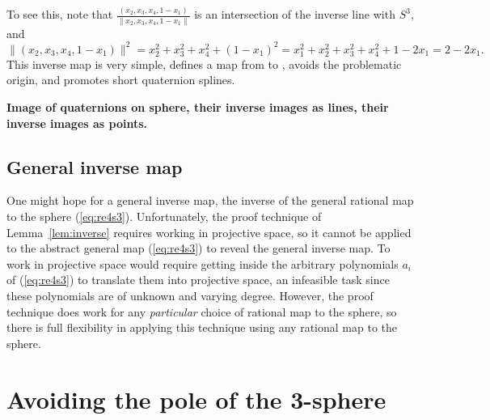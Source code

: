 \documentclass[11pt]{article}
\begin{document}
%
To see this, note that $\frac{(x_2,x_3,x_4,1-x_1)}{\|x_2,x_3,x_4,1-x_1\|}$ is
an intersection of the inverse line with $S^3$, and
\[
\|(x_2,x_3,x_4,1-x_1)\|^2 = x_2^2 + x_3^2 + x_4^2 + (1-x_1)^2
= x_1^2 + x_2^2 + x_3^2 + x_4^2 + 1 - 2x_1 = 2 - 2x_1.
\]
%
This inverse map is very simple, defines a map from  to ,
avoids the problematic origin, and promotes short quaternion splines.


{\bf Image of quaternions on sphere, their inverse images as lines, their inverse images
as points.}


\subsection{General inverse map}

One might hope for a general inverse map, the inverse of the general 
rational map to the sphere (\ref{eq:re4s3}).
Unfortunately, the proof technique of Lemma~\ref{lem:inverse}
requires working in projective space, 
so it cannot be applied to the abstract general map (\ref{eq:re4s3})
to reveal the general inverse map.
To work in projective space
would require getting inside the arbitrary polynomials
$a_i$ of (\ref{eq:re4s3}) to translate them into projective space,
an infeasible task since these polynomials are of unknown and varying degree.
However, the proof technique does work for any {\em particular} choice of rational
map to the sphere, so there is full flexibility in applying this technique
using any rational map to the sphere.

\clearpage

\section{Avoiding the pole of the 3-sphere}
\label{sec:pole}
\end{document}

